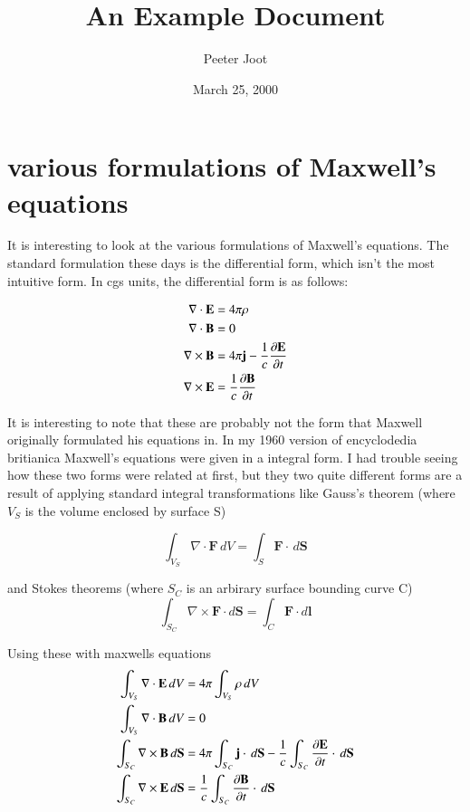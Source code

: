 \documentclass{article}      %
\title{An Example Document}  %
\author{Peeter Joot}         %
\date{March 25, 2000}        %
\newcommand{\Curl}[1]{\nabla \times \mathbf{#1}}
\newcommand{\Diverg}[1]{\nabla \cdot \mathbf{#1}}
\newcommand{\Ddt}[1]{ {{\partial{\mathbf{#1}}} \over {\partial{t}}}}
\newcommand{\Bj}[0]{\mathbf{j}}
\newcommand{\BS}[0]{\mathbf{S}}
\begin{document}


\section{various formulations of Maxwell's equations}

It is interesting to look at the various formulations of Maxwell's 
equations.  The standard formulation these days is the differential
form, which isn't the most intuitive form.  In cgs units, the differential
form is as follows:

\begin{align*}
\Diverg E &= 4\pi\rho \\
\Diverg B &= 0 \\
\Curl{B} &= 4\pi \Bj - {1 \over c} \Ddt{E} \\
\Curl{E} &= {1 \over c} \Ddt{B}
\end{align*}

It is interesting to note that these are probably not the form that Maxwell 
originally formulated his equations in.  In my 1960 version of encyclodedia 
britianica Maxwell's equations were given in a integral form.  I had 
trouble seeing how these two forms were related at first, but they two 
quite different forms are a result of applying standard integral 
transformations like Gauss's theorem (where $V_S$ is the volume enclosed by surface S)

\begin{equation*}
\int_{V_S} \Diverg{F}\,dV =
\int_S \mathbf{F} \cdot\, d\BS 
\end{equation*}

and Stokes theorems (where $S_C$ is an arbirary surface bounding curve C)
\begin{equation*}
\int_{S_C} \Curl{F} \cdot d\BS = \int_C \mathbf{F} \cdot d\mathbf{l}
\end{equation*}

Using these with maxwells equations
\begin{align*}
\int_{V_S} \Diverg E \, dV &= 4\pi \int_{V_S} \rho\, dV \\
\int_{V_S} \Diverg B \, dV &= 0 \\
\int_{S_C} \Curl{B} \, d\BS &= 4\pi \int_{S_C} \Bj \cdot \, d\BS - {1 \over c} \int_{S_C} \Ddt{E} \cdot \, d\BS \\
\int_{S_C} \Curl{E} \, d\BS &= {1 \over c} \int_{S_C} \Ddt{B} \cdot \, d\BS
\end{align*}
\end{document}
